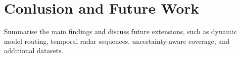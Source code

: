 \section{Conlusion and Future Work}
Summarise the main findings and discuss future extensions, such as dynamic model routing, temporal radar sequences, uncertainty-aware coverage, and additional datasets.
